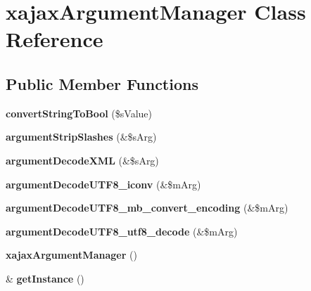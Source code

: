 \hypertarget{classxajaxArgumentManager}{
\section{xajaxArgumentManager Class Reference}
\label{classxajaxArgumentManager}
}
\subsection*{Public Member Functions}
\begin{DoxyCompactItemize}
\item 
\hypertarget{classxajaxArgumentManager_aa12e79957f8bb18d7f93bb791f90568e}{
{\bfseries convertStringToBool} (\$sValue)}
\label{classxajaxArgumentManager_aa12e79957f8bb18d7f93bb791f90568e}

\item 
\hypertarget{classxajaxArgumentManager_aa6ad551d55085f38303b6028a2298b3c}{
{\bfseries argumentStripSlashes} (\&\$sArg)}
\label{classxajaxArgumentManager_aa6ad551d55085f38303b6028a2298b3c}

\item 
\hypertarget{classxajaxArgumentManager_a3f39377ad1100254a89988be046474a5}{
{\bfseries argumentDecodeXML} (\&\$sArg)}
\label{classxajaxArgumentManager_a3f39377ad1100254a89988be046474a5}

\item 
\hypertarget{classxajaxArgumentManager_ad697bdfc07308a870da594063a0bb508}{
{\bfseries argumentDecodeUTF8\_\-iconv} (\&\$mArg)}
\label{classxajaxArgumentManager_ad697bdfc07308a870da594063a0bb508}

\item 
\hypertarget{classxajaxArgumentManager_a6ec3cc3b1d75f1cd5fed9ff35a1950cf}{
{\bfseries argumentDecodeUTF8\_\-mb\_\-convert\_\-encoding} (\&\$mArg)}
\label{classxajaxArgumentManager_a6ec3cc3b1d75f1cd5fed9ff35a1950cf}

\item 
\hypertarget{classxajaxArgumentManager_a4682b61be3bd4e2e962f6ad615968a21}{
{\bfseries argumentDecodeUTF8\_\-utf8\_\-decode} (\&\$mArg)}
\label{classxajaxArgumentManager_a4682b61be3bd4e2e962f6ad615968a21}

\item 
\hypertarget{classxajaxArgumentManager_aa2ebe38c8fc08b0c420e551525610f72}{
{\bfseries xajaxArgumentManager} ()}
\label{classxajaxArgumentManager_aa2ebe38c8fc08b0c420e551525610f72}

\item 
\hypertarget{classxajaxArgumentManager_aa409aa49b17451dba24b0c6a139f1aa0}{
\& {\bfseries getInstance} ()}
\label{classxajaxArgumentManager_aa409aa49b17451dba24b0c6a139f1aa0}


\end{DoxyCompactItemize}
